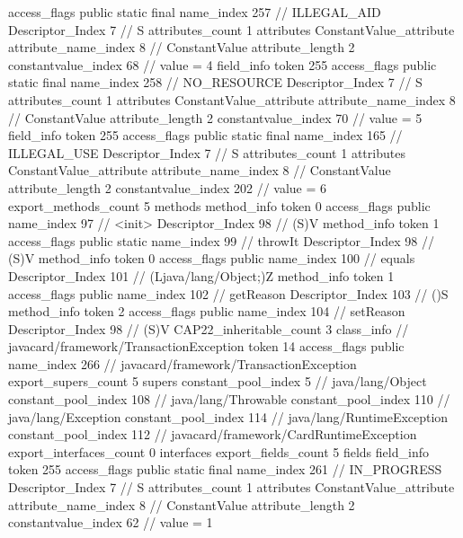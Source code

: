 {{{{{				access_flags	public static final
				name_index	257		// ILLEGAL_AID
				Descriptor_Index	7		// S
				attributes_count	1
				attributes {
				ConstantValue_attribute {
					attribute_name_index	8		// ConstantValue
					attribute_length	2
					constantvalue_index	68		// value = 4
				}
				}
			}
			field_info {
				token	255
				access_flags	public static final
				name_index	258		// NO_RESOURCE
				Descriptor_Index	7		// S
				attributes_count	1
				attributes {
				ConstantValue_attribute {
					attribute_name_index	8		// ConstantValue
					attribute_length	2
					constantvalue_index	70		// value = 5
				}
				}
			}
			field_info {
				token	255
				access_flags	public static final
				name_index	165		// ILLEGAL_USE
				Descriptor_Index	7		// S
				attributes_count	1
				attributes {
				ConstantValue_attribute {
					attribute_name_index	8		// ConstantValue
					attribute_length	2
					constantvalue_index	202		// value = 6
				}
				}
			}
			}
			export_methods_count	5
			methods {
				method_info {
					token	0
					access_flags	public
					name_index	97		// <init>
					Descriptor_Index	98		// (S)V
				}
				method_info {
					token	1
					access_flags	public static
					name_index	99		// throwIt
					Descriptor_Index	98		// (S)V
				}
				method_info {
					token	0
					access_flags	public
					name_index	100		// equals
					Descriptor_Index	101		// (Ljava/lang/Object;)Z
				}
				method_info {
					token	1
					access_flags	public
					name_index	102		// getReason
					Descriptor_Index	103		// ()S
				}
				method_info {
					token	2
					access_flags	public
					name_index	104		// setReason
					Descriptor_Index	98		// (S)V
				}
			}
			CAP22_inheritable_count	3
		}
		class_info {		// javacard/framework/TransactionException
			token	14
			access_flags	public
			name_index	266		// javacard/framework/TransactionException
			export_supers_count	5
			supers {
				constant_pool_index	5		// java/lang/Object
				constant_pool_index	108		// java/lang/Throwable
				constant_pool_index	110		// java/lang/Exception
				constant_pool_index	114		// java/lang/RuntimeException
				constant_pool_index	112		// javacard/framework/CardRuntimeException
			}
			export_interfaces_count	0
			interfaces {
			}
			export_fields_count	5
			fields {
			field_info {
				token	255
				access_flags	public static final
				name_index	261		// IN_PROGRESS
				Descriptor_Index	7		// S
				attributes_count	1
				attributes {
				ConstantValue_attribute {
					attribute_name_index	8		// ConstantValue
					attribute_length	2
					constantvalue_index	62		// value = 1
				}
				}
}}}}}
